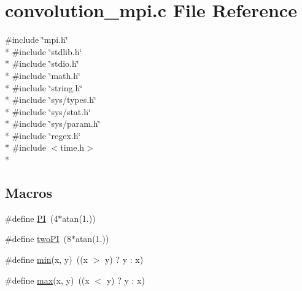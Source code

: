 \section{convolution\-\_\-mpi.\-c File Reference}
\label{convolution__mpi_8c}
{\ttfamily \#include \char`\"{}mpi.\-h\char`\"{}}\\*
{\ttfamily \#include \char`\"{}stdlib.\-h\char`\"{}}\\*
{\ttfamily \#include \char`\"{}stdio.\-h\char`\"{}}\\*
{\ttfamily \#include \char`\"{}math.\-h\char`\"{}}\\*
{\ttfamily \#include \char`\"{}string.\-h\char`\"{}}\\*
{\ttfamily \#include \char`\"{}sys/types.\-h\char`\"{}}\\*
{\ttfamily \#include \char`\"{}sys/stat.\-h\char`\"{}}\\*
{\ttfamily \#include \char`\"{}sys/param.\-h\char`\"{}}\\*
{\ttfamily \#include \char`\"{}regex.\-h\char`\"{}}\\*
{\ttfamily \#include $<$time.\-h$>$}\\*
\subsection*{Macros}
\begin{DoxyCompactItemize}
\item 
\#define \hyperlink{convolution__mpi_8c_a598a3330b3c21701223ee0ca14316eca}{P\-I}~(4$\ast$atan(1.))
\item 
\#define \hyperlink{convolution__mpi_8c_a0a3527f8b23535fe43972fbe88c3cc0d}{two\-P\-I}~(8$\ast$atan(1.))
\item 
\#define \hyperlink{convolution__mpi_8c_abb702d8b501669a23aa0ab3b281b9384}{min}(x, y)~((x $>$ y) ? y \-: x)
\item 
\#define \hyperlink{convolution__mpi_8c_ac39d9cef6a5e030ba8d9e11121054268}{max}(x, y)~((x $<$ y) ? y \-: x)
\end{DoxyCompactItemize}
